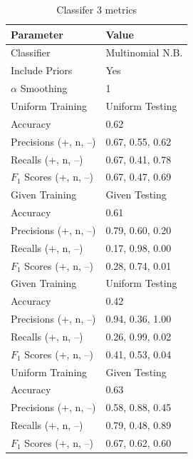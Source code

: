 \documentclass[11pt]{article}
\begin{document}
\begin{table}[H]
	\begin{center}
		\begin{tabular}{|l|l|}			
			\hline
			Parameter & Value \\
			\hline
			Classifier & Multinomial N.B. \\
			Include Priors & Yes \\
			$\alpha$ Smoothing & 1 \\
			\hline\hline
			Uniform Training & Uniform Testing \\
			\hline
			Accuracy & 0.62 \\
			Precisions (+, n, --) 	& 0.67, 0.55, 0.62 \\
			Recalls (+, n, --) 		& 0.67, 0.41, 0.78 \\
			$F_1$ Scores (+, n, --) & 0.67, 0.47, 0.69 \\
			\hline\hline
			Given Training & Given Testing \\
			\hline
			Accuracy & 0.61 \\
			Precisions (+, n, --) 	& 0.79, 0.60, 0.20 \\
			Recalls (+, n, --) 		& 0.17, 0.98, 0.00 \\
			$F_1$ Scores (+, n, --) & 0.28, 0.74, 0.01 \\
			\hline\hline
			Given Training & Uniform Testing \\
			\hline
			Accuracy & 0.42 \\
			Precisions (+, n, --) 	& 0.94, 0.36, 1.00 \\
			Recalls (+, n, --) 		& 0.26, 0.99, 0.02 \\
			$F_1$ Scores (+, n, --) & 0.41, 0.53, 0.04 \\
			\hline\hline
			Uniform Training & Given Testing \\
			\hline
			Accuracy & 0.63 \\
			Precisions (+, n, --) 	& 0.58, 0.88, 0.45 \\
			Recalls (+, n, --) 		& 0.79, 0.48, 0.89 \\
			$F_1$ Scores (+, n, --) & 0.67, 0.62, 0.60 \\
			\hline
		\end{tabular}
		\caption{Classifer 3 metrics}
		\label{tbl:metrics-3rd10000}
	\end{center}
\end{table}

\end{document}
